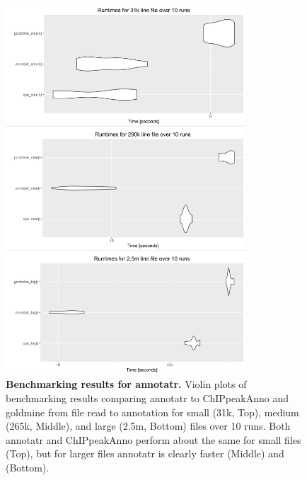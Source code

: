 \begin{figure}[ht!]
\centering
\includegraphics[width=0.8\textwidth]{chap4figs/figure4_8.pdf}
\caption[Benchmarking results for annotatr.]
{
\textbf{Benchmarking results for annotatr.} Violin plots of benchmarking results comparing annotatr to ChIPpeakAnno and goldmine from file read to annotation for small (31k, Top), medium (265k, Middle), and large (2.5m, Bottom) files over 10 runs. Both annotatr and ChIPpeakAnno perform about the same for small files (Top), but for larger files annotatr is clearly faster (Middle) and (Bottom).
}
\label{chap4:fig:8}
\end{figure}

